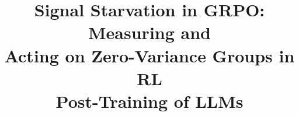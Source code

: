 \documentclass[conference]{IEEEtran}
\begin{document}
\title{Signal Starvation in GRPO: Measuring and\\ Acting on Zero-Variance Groups in RL\\ Post-Training of LLMs}
\author{}
\maketitle



\end{document}
